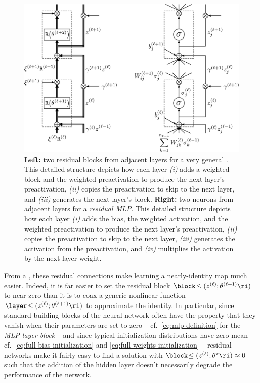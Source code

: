 \begin{figure}
\begin{center}
 \includegraphics[width=1\linewidth]{./book_figures/residual.pdf}
\caption{
\textbf{Left:} two residual blocks from adjacent layers for a very general . This detailed structure depicts how  each layer
\emph{(i)} adds a weighted block and the weighted preactivation to produce the next layer's preactivation,
\emph{(ii)} copies the preactivation to skip to the next layer,
and \emph{(iii)} generates the next layer's block.
\textbf{Right:} two neurons from adjacent layers for a 
\emph{residual MLP}. 
This detailed structure depicts how each layer \emph{(i)} adds the bias, 
the weighted activation, and the weighted preactivation 
to produce the next layer's preactivation, 
\emph{(ii)} copies the preactivation to skip to the next layer,
\emph{(iii)} generates the activation 
from the preactivation, and \emph{(iv)} multiplies the activation by the next-layer weight.
}
\label{fig:residual-example}
\end{center}
\end{figure}




From a , 
these residual connections make learning a nearly-identity map much easier. %
Indeed, it is 
far easier to set the residual block $\block\!\le(z^{(\ell)}; \theta^{(\ell+1)}\ri)$ to near-zero than it is to coax a generic nonlinear function $\layer\!\le(z^{(\ell)}; \theta^{(\ell+1)}\ri)$ to approximate the identity.
In particular, since standard building blocks of the neural network often have the property that they vanish when their parameters are set to zero -- cf.~\eqref{eq:mlp-definition} for the \emph{MLP-layer block} -- and since typical initialization distributions have zero mean -- cf.~\eqref{eq:full-bias-initialization} and \eqref{eq:full-weights-initialization} -- residual networks make it fairly easy to find a solution with $\block\!\le(z^{(\ell)}; \theta^{\star}\ri)\approx 0$ %
such that the addition of the hidden layer doesn't necessarily degrade the performance of the network.


